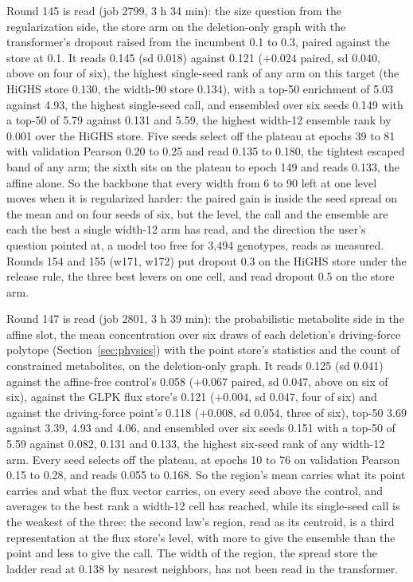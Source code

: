 Round 145 is read (job 2799, 3 h 34 min): the size question from the regularization
side, the store arm on the deletion-only graph with the transformer's dropout raised
from the incumbent 0.1 to 0.3, paired against the store at 0.1. It reads 0.145 (sd
0.018) against 0.121 ($+0.024$ paired, sd 0.040, above on four of six), the highest
single-seed rank of any arm on this target (the HiGHS store 0.130, the width-90 store
0.134), with a top-50 enrichment of 5.03 against 4.93, the highest single-seed call,
and ensembled over six seeds 0.149 with a top-50 of 5.79 against 0.131 and 5.59, the
highest width-12 ensemble rank by 0.001 over the HiGHS store. Five seeds select off the
plateau at epochs 39 to 81 with validation Pearson 0.20 to 0.25 and read 0.135 to
0.180, the tightest escaped band of any arm; the sixth sits on the plateau to epoch 149
and reads 0.133, the affine alone. So the backbone that every width from 6 to 90 left
at one level moves when it is regularized harder: the paired gain is inside the seed
spread on the mean and on four seeds of six, but the level, the call and the ensemble
are each the best a single width-12 arm has read, and the direction the user's
question pointed at, a model too free for 3,494 genotypes, reads as measured. Rounds
154 and 155 (w171, w172) put dropout 0.3 on the HiGHS store under the release rule,
the three best levers on one cell, and read dropout 0.5 on the store arm.

Round 147 is read (job 2801, 3 h 39 min): the probabilistic metabolite side in the
affine slot, the mean concentration over six draws of each deletion's driving-force
polytope (Section~\ref{sec:physics}) with the point store's statistics and the count
of constrained metabolites, on the deletion-only graph. It reads 0.125 (sd 0.041)
against the affine-free control's 0.058 ($+0.067$ paired, sd 0.047, above on six of
six), against the GLPK flux store's 0.121 ($+0.004$, sd 0.047, four of six) and
against the driving-force point's 0.118 ($+0.008$, sd 0.054, three of six), top-50
3.69 against 3.39, 4.93 and 4.06, and ensembled over six seeds 0.151 with a top-50 of
5.59 against 0.082, 0.131 and 0.133, the highest six-seed rank of any width-12 arm.
Every seed selects off the plateau, at epochs 10 to 76 on validation Pearson 0.15 to
0.28, and reads 0.055 to 0.168. So the region's mean carries what its point carries
and what the flux vector carries, on every seed above the control, and averages to the
best rank a width-12 cell has reached, while its single-seed call is the weakest of the
three: the second law's region, read as its centroid, is a third representation at the
flux store's level, with more to give the ensemble than the point and less to give the
call. The width of the region, the spread store the ladder read at 0.138 by nearest
neighbors, has not been read in the transformer.

